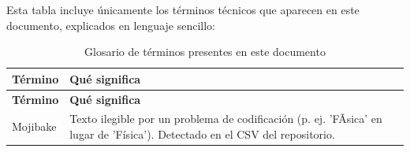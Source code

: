 Esta tabla incluye únicamente los términos técnicos que aparecen en este
documento, explicados en lenguaje sencillo:

\begingroup
\small
\setlength{\tabcolsep}{3pt}
\begin{longtable}{>{\raggedright\arraybackslash}p{4.3cm}>{\raggedright\arraybackslash}p{9.8cm}}
\caption{Glosario de términos presentes en este documento}
\label{tab:glosario}\\
\toprule
\textbf{Término} & \textbf{Qué significa} \\
\midrule
\endfirsthead
\toprule
\textbf{Término} & \textbf{Qué significa} \\
\midrule
\endhead
    Mojibake & Texto ilegible por un problema de codificación (p. ej. 'FÃ­sica' en lugar de 'Física'). Detectado en el CSV del repositorio.
 \\
\bottomrule
\end{longtable}
\endgroup
